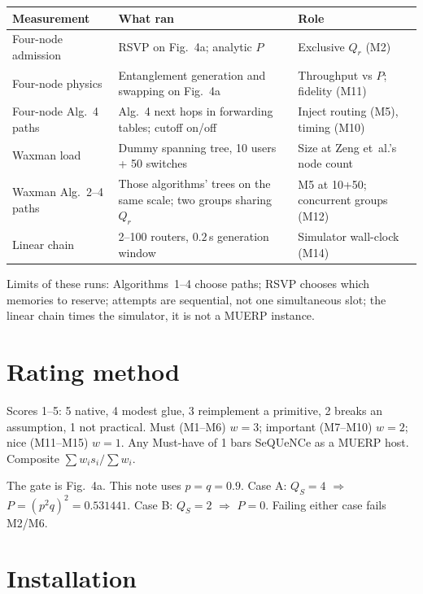 \documentclass[11pt]{article}
\begin{document}
\begin{center}
\begin{tabularx}{\textwidth}{@{}P{1.55in} Y Y@{}}
\toprule
Measurement & What ran & Role \\
\midrule
Four-node admission & RSVP on Fig.~4a; analytic $P$ & Exclusive $Q_r$ (M2) \\
Four-node physics & Entanglement generation and swapping on Fig.~4a & Throughput vs $P$; fidelity (M11) \\
Four-node Alg.~4 paths & Alg.~4 next hops in forwarding tables; cutoff on/off & Inject routing (M5), timing (M10) \\
Waxman load & Dummy spanning tree, 10 users + 50 switches & Size at Zeng et~al.'s node count \\
Waxman Alg.~2--4 paths & Those algorithms' trees on the same scale; two groups sharing $Q_r$ & M5 at 10+50; concurrent groups (M12) \\
Linear chain & 2--100 routers, $0.2$\,s generation window & Simulator wall-clock (M14) \\
\bottomrule
\end{tabularx}
\end{center}

Limits of these runs:
Algorithms~1--4 choose paths; RSVP chooses which memories to reserve;
attempts are sequential, not one simultaneous slot;
the linear chain times the simulator, it is not a MUERP instance.

\section{Rating method}

Scores 1--5: 5 native, 4 modest glue, 3 reimplement a primitive, 2 breaks an assumption, 1 not practical.
Must (M1--M6) $w=3$; important (M7--M10) $w=2$; nice (M11--M15) $w=1$.
Any Must-have of 1 bars SeQUeNCe as a MUERP host.
Composite $\sum w_i s_i / \sum w_i$.

The gate is Fig.~4a.
This note uses $p=q=0.9$.
Case A: $Q_S=4$ $\Rightarrow$ $P=(p^2 q)^2=0.531441$.
Case B: $Q_S=2$ $\Rightarrow$ $P=0$.
Failing either case fails M2/M6.

\section{Installation}
\end{document}

